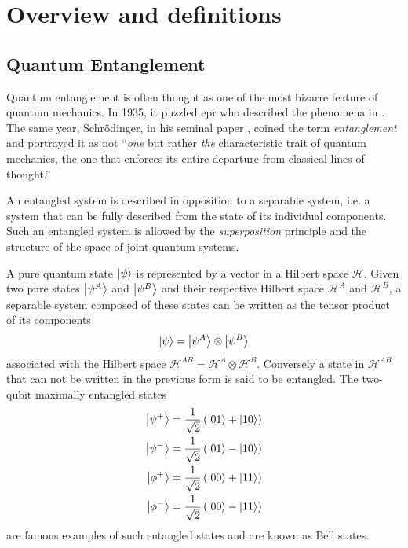 \part{Overview and definitions}
\label{part:intro}

\chapter{Quantum Entanglement}
\label{section:entanglement}

Quantum entanglement is often thought as one of the most bizarre feature of quantum mechanics. 
In 1935, it puzzled \acrfull{epr} who described the phenomena in \cite{Einstein35}. 
The same year, Schrödinger, in his seminal paper \cite{Schrödinger35},
coined the term \textit{entanglement} and portrayed it as not \enquote{\textit{one} but rather \textit{the} characteristic trait of quantum mechanics, the one that enforces its entire departure from classical lines of thought.}

An entangled system is described in opposition to a separable system, i.e. a system that can be fully described from the state of its individual components. 
Such an entangled system is allowed by the \textit{superposition} principle and the structure of the space of joint quantum systems. 

A pure quantum state $\ket{\psi}$ is represented by a vector in a Hilbert space $\mathscr{H}$.
Given two pure states $\ket{\psi^A}$ and $\ket{\psi^B}$ and their respective Hilbert space $\mathscr{H}^A$ and $\mathscr{H}^B$, a separable system composed of these states can be written as the tensor product of its components
\begin{equation}
	\ket{\psi} = \ket{\psi^A} \otimes \ket{\psi^B}
	\label{eq:separable_state}
\end{equation}
associated with the Hilbert space $\mathscr{H}^{AB}=\mathscr{H}^A\otimes\mathscr{H}^B$. 
Conversely a state in $\mathscr{H}^{AB}$ that can not be written in the previous form is said to be entangled.
The two-qubit maximally entangled states
\begin{align}
	\ket{\psi^+} &= \frac{1}{\sqrt{2}}\left(\ket{01}+\ket{10}\right) \\
	\ket{\psi^-} &= \frac{1}{\sqrt{2}}\left(\ket{01}-\ket{10}\right) \\
	\ket{\phi^+} &= \frac{1}{\sqrt{2}}\left(\ket{00}+\ket{11}\right) \\
	\ket{\phi^-} &= \frac{1}{\sqrt{2}}\left(\ket{00}-\ket{11}\right)
	\label{eq:bell_states}
\end{align}
are famous examples of such entangled states and are known as Bell states.

